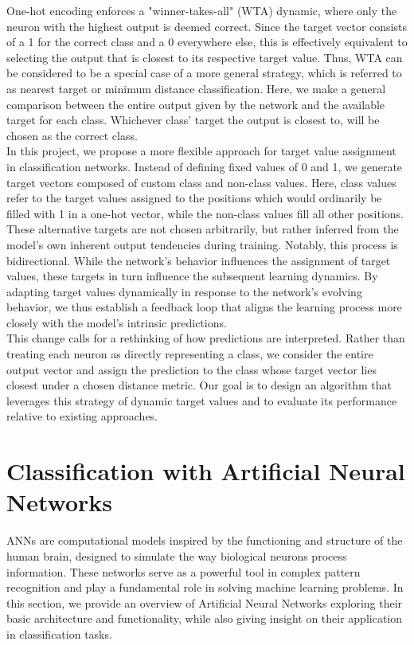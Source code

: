 \documentclass[12pt,fleqn,a4paper]{article}
\begin{document}
One-hot encoding enforces a "winner-takes-all" (WTA) dynamic, where only the neuron with the highest output is deemed correct. Since the target vector consists of a 1 for the correct class and a 0 everywhere else, this is effectively equivalent to selecting the output that is closest to its respective target value. Thus, WTA can be considered to be a special case of a more general strategy, which is referred to as nearest target or minimum distance classification. Here, we make a general comparison between the entire output given by the network and the available target for each class. Whichever class' target the output is closest to, will be chosen as the correct class. \\

In this project, we propose a more flexible approach for target value assignment in classification networks. Instead of defining fixed values of 0 and 1, we generate target vectors composed of custom class and non-class values. Here, class values refer to the target values assigned to the positions which would ordinarily be filled with 1 in a one-hot vector, while the non-class values fill all other positions. These alternative targets are not chosen arbitrarily, but rather inferred from the model's own inherent output tendencies during training. Notably, this process is bidirectional. While the network's behavior influences the assignment of target values, these targets in turn influence the subsequent learning dynamics. By adapting target values dynamically in response to the network's evolving behavior, we thus establish a feedback loop that aligns the learning process more closely with the model's intrinsic predictions.\\

This change calls for a rethinking of how predictions are interpreted. Rather than treating each neuron as directly representing a class, we consider the entire output vector and assign the prediction to the class whose target vector lies closest under a chosen distance metric. Our goal is to design an algorithm that leverages this strategy of dynamic target values and to evaluate its performance relative to existing approaches. 

\section{Classification with Artificial Neural Networks}\label{sec:class}
ANNs are computational models inspired by the functioning and structure of the human brain, designed to simulate the way biological neurons process information. These networks serve as a powerful tool in complex pattern recognition and play a fundamental role in solving machine learning problems.  In this section, we provide an overview of Artificial Neural Networks exploring their basic architecture and functionality, while also giving insight on their application in classification tasks.
\end{document}

